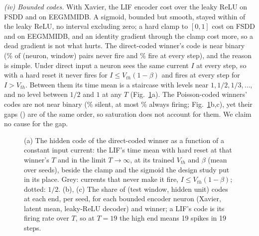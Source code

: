 \documentclass[conference]{IEEEtran}
\begin{document}
\par \emph{(iv) Bounded codes.} With Xavier, the LIF encoder cost \designLifCostFsdd{} over the
leaky ReLU on FSDD and \designLifCostEeg{} on EEGMMIDB. A sigmoid, bounded but smooth, stayed
within \designSigmoidWithin{} of the leaky ReLU, no interval excluding zero; a hard clamp to
$[0,1]$ cost \designClampFsdd{} on FSDD and \designClampEeg{} on EEGMMIDB, and an identity
gradient through the clamp cost more, so a dead gradient is not what hurts. The direct-coded
winner's code is near binary (\designDirectSilent\% of (neuron, window) pairs never fire and
\designDirectAlways\% fire at every step), and the reason is simple. Under direct input a neuron
sees the same current $I$ at every step, so with a hard reset it never fires for
$I\leq V_{th}(1-\beta)$ and fires at every step for $I>V_{th}$. Between them its time mean is a
staircase with levels near $1, 1/2, 1/3, \dots$, and no level between $1/2$ and $1$ at any $T$
(Fig.~\ref{fig:lif}a). The Poisson-coded winners' codes are not near
binary (\designPoissonSilent\% silent, at most \designPoissonAlwaysMax\% always firing;
Fig.~\ref{fig:lif}b,c), yet their
gaps (\designPoissonGap{}) are of the same order, so saturation does not account for them. We
claim no cause for the gap.

\begin{figure}[!t]
  \centering
  
  \caption{(a) The hidden code of the direct-coded winner as a function of a constant input
  current: the LIF's time mean with hard reset at that winner's $T$ and in the limit
  $T\to\infty$, at its trained $V_{th}$ and $\beta$ (mean over seeds), beside the clamp and the
  sigmoid the design study put in its place. Grey: currents that never make it fire,
  $I\leq V_{th}(1-\beta)$; dotted: $1/2$. (b), (c) The share of (test window, hidden unit) codes
  at each end, per seed, for each bounded encoder neuron (Xavier, latent mean, leaky-ReLU
  decoder) and winner; a LIF's code is its firing rate over $T$, so at $T=19$ the high end means
  19 spikes in 19 steps.}
  \label{fig:lif}
\end{figure}
\end{document}

